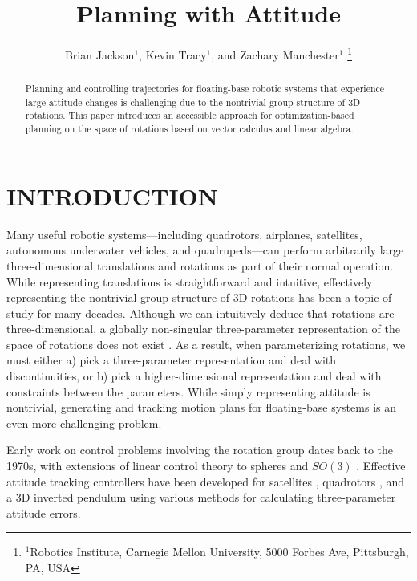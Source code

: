 \documentclass[letterpaper, 10 pt, conference]{ieeeconf}  %
\title{\LARGE \bf
Planning with Attitude
}
\author{Brian Jackson$^1$, Kevin Tracy$^1$, and Zachary Manchester$^1$%
    \thanks{
        $^1$Robotics Institute, 
        Carnegie Mellon University, 
        5000 Forbes Ave, Pittsburgh, PA, USA
    }
}
\begin{document}
\maketitle

\begin{abstract}
Planning and controlling trajectories for floating-base robotic systems that experience
large attitude changes is challenging due to the nontrivial group structure of 3D
rotations. This paper introduces an accessible approach for 
optimization-based planning on the space of rotations based on vector calculus and
linear algebra. 
\end{abstract}

\section{INTRODUCTION}

    Many useful robotic systems---including quadrotors, airplanes, satellites, autonomous
    underwater vehicles, and quadrupeds---can perform arbitrarily large three-dimensional
    translations and rotations as part of their normal operation. While representing
    translations is straightforward and intuitive, effectively representing the
    nontrivial group structure of 3D rotations has been a topic of study for many
    decades. Although we can intuitively deduce that rotations are three-dimensional, a
    globally non-singular three-parameter representation of the space of rotations does
    not exist \cite{stuelpnagel1964parametrization}. As a result, when parameterizing
    rotations, we must either a) pick a three-parameter representation and deal with
    discontinuities, or b) pick a higher-dimensional representation and deal with
    constraints between the parameters. While simply representing attitude is nontrivial,
    generating and tracking motion plans for floating-base systems is an even more
    challenging problem.

    Early work on control problems involving the rotation group dates back to the 1970s,
    with extensions of linear control theory to spheres \cite{Brockett1973} and $SO(3)$
    \cite{Baillieul1978}. Effective attitude tracking controllers have been developed for
    satellites \cite{wie1985quaternion}, quadrotors
    \cite{Fresk2013,Liu2015,lee2010geometric,
    Johnson2005,watterson2020control,mellinger2011minimum}, and a 3D inverted pendulum
    \cite{Chaturvedi2009} using various methods for calculating three-parameter attitude
    errors.
\end{document}
